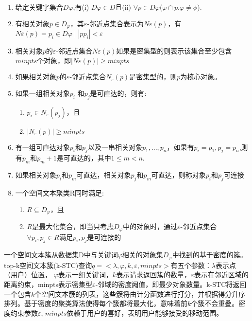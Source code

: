\begin{enumerate}[labelwidth=1.5cm,labelindent=10pt,leftmargin=2.2cm,label=\bfseries{ 定义 \arabic*:},align=left]
	\setcounter{enumi}{0}%
	
  \item 给定关键字集合$D\varphi$,有(i) $D\varphi \in D$且(ii) $\forall p \in D\varphi$($\varphi \cap p. \varphi\neq\phi$).
  \item 有相关对象$p \in D_{\varphi}$，其$\varepsilon$-邻近点集合表示为$N\varepsilon(p)$，有$N\varepsilon(p) = { p_{i}\in D\varphi \mid \left| pp_{i}\right| < \varepsilon }$
  \item 相关对象$p$的$ \varepsilon $-邻近点集合$N \varepsilon (p)$如果是密集型的则表示该集合至少包含$minpts$个对象，即$\left| N \varepsilon (p) \right| \geq minpts$
  \item 如果相关对象$p$的$\varepsilon$-邻近点集合$N_{\varepsilon}(p)$是密集型的，则$p$为核心对象。
  \item 如果一组相关对象$p_{i}$ 和$p_{j}$是可直达的，则有: 
  \begin{enumerate}
		\item $p_{i} \in  N_{\varepsilon}(p_{j})$，且
		\item $\left| N_{\varepsilon}(p) \right| \geq minpts$
	\end{enumerate}
	
	\item 有一组可直达对象$p_{i}$和$p_{j}$以及一串相关对象$p_{1}, ..., p_{n}$，如果有$p_{i} = p_{1}, p_{j} = p_{n}$,则有$p_{m}和p_{m}+1$是可直达的，其中$1 \leq m < n.$ 

	\item 如果相关对象$p_{i}$和$p_{m}$可直达，相关对象$p_{j}$和$p_{m}$可直达，则称对象$p_{i}$和$p_{j}$可连接

	\item 一个空间文本聚类R同时满足: 
	\begin{enumerate}
		\item $R \subseteq D_{\varphi}$，且
		\item $R$是最大化集合，即当只考虑$D_{\varphi}$中的对象时，通过$\varepsilon$-邻近点集合$\forall p_{i},p_{j} \in R$满足$p_{i},p_{j}$是可连接的
	\end{enumerate}

\end{enumerate}

一个空间文本簇从数据集D中与关键词$\varphi$相关的对象集$D_{\varphi}$中找到的基于密度的簇。top-k空间文本簇(k-STC)查询$q =<\lambda, \varphi, k, \varepsilon, minpts>$有五个参数：$\lambda$表示点（用户）位置， $\varphi$表示一组关键词，$k$表示请求返回簇的数量，$\varepsilon$表示在邻近区域的距离约束，minpts表示密集型$\varepsilon$-邻域的密度阙值，即最少对象数量。k-STC将返回一个包含$k$个空间文本簇的列表，这些簇将由计分函数进行打分，并根据得分升序排列。基于密度的聚类算法使得每个簇都将最大化，意味着前$k$个簇不会重叠。密度约束参数$\varepsilon$, $minpts$依赖于用户的喜好，表明用户能够接受的移动范围。

